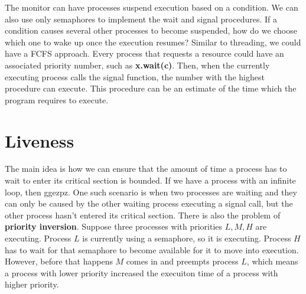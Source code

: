 \documentclass{tufte-handout}
\begin{document}
The monitor can have processes suspend execution based on a condition. We can also use 
only semaphores to implement the wait and signal procedures. If a condition causes 
several other processes to become suspended, how do we choose which one to wake up 
once the execution resumes? Similar to threading, we could have a FCFS approach. Every 
process that requests a resource could have an associated priority number, such as 
\textbf{x.wait(c)}. Then, when the currently executing process calls the signal 
function, the number with the highest procedure can execute. This procedure can 
be an estimate of the time which the program requires to execute.

\section{Liveness}
The main idea is how we can ensure that the amount of time a process has to wait to enter its
critical section is bounded. If we have a process with an infinite loop, then ggezpz.
One such scenario is when two processes are waiting and they can only be caused by the 
other waiting process executing a signal call, but the other process hasn't entered its
critical section. There is also the problem of \textbf{priority inversion}. Suppose 
three processes with priorities $L, M, H$ are executing. Process $L$ is currently using a 
semaphore, so it is executing. Process $H$ has to wait for that semaphore to become available 
for it to move into execution. However, before that happens $M$ comes in and preempts process $L$,
which means a process with lower priority increased the execuiton time of a process with higher
priority.
\end{document}
